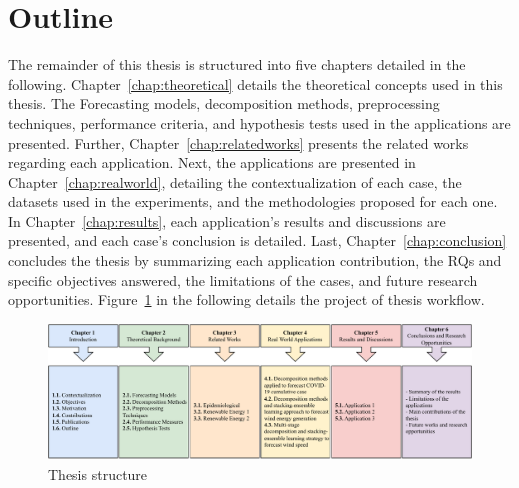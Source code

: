 \section{Outline} \label{sec:outline}

The remainder of this thesis is structured into five chapters detailed in the following. Chapter~\ref{chap:theoretical} details the theoretical concepts used in this thesis. The Forecasting models, decomposition methods, preprocessing techniques, performance criteria, and hypothesis tests used in the applications are presented. Further, Chapter~\ref{chap:relatedworks} presents the related works regarding each application. Next, the applications are presented in Chapter~\ref{chap:realworld}, detailing the contextualization of each case, the datasets used in the experiments, and the methodologies proposed for each one. In Chapter~\ref{chap:results}, each application's results and discussions are presented, and each case's conclusion is detailed. Last, Chapter~\ref{chap:conclusion} concludes the thesis by summarizing each application contribution, the \ac{RQ}s and specific objectives answered, the limitations of the cases, and future research opportunities. Figure~\ref{fig:outline} in the following details the project of thesis workflow.

\begin{landscape}
\begin{figure}[htb!]
    \centering
    \includegraphics[width=1.5\textwidth]{Media/thesis-outline-transposed.pdf}
    \caption{Thesis structure}
    \label{fig:outline}
\end{figure}
\end{landscape}